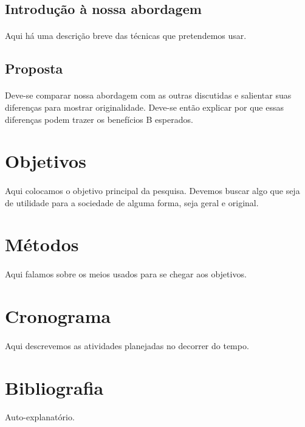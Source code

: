 \documentclass[11pt]{report}
\begin{document}
\subsection{Introdução à nossa abordagem}
\paragraph{}
Aqui há uma descrição breve das técnicas que pretendemos usar.

\subsection{Proposta}
\paragraph{}
Deve-se comparar nossa abordagem com as outras discutidas e salientar suas
diferenças para mostrar originalidade.
Deve-se então explicar por que essas diferenças podem trazer os benefícios 
B esperados.

\section{Objetivos}
\paragraph{}
Aqui colocamos o objetivo principal da pesquisa. Devemos buscar algo que
seja de utilidade para a sociedade de alguma forma, seja geral e original.

\section{Métodos}
\paragraph{}
Aqui falamos sobre os meios usados para se chegar aos objetivos.

\section{Cronograma}
\paragraph{}
Aqui descrevemos as atividades planejadas no decorrer do tempo.

\section{Bibliografia}
\paragraph{}
Auto-explanatório.
\end{document}
